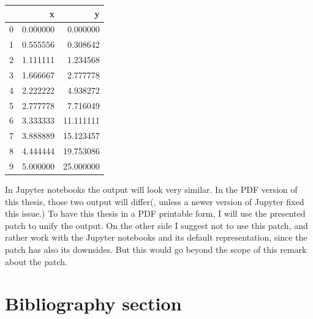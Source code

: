 \documentclass[11pt]{article}
\begin{document}
    
    \begin{center}
    {\begin{tabular}{lrr}
\toprule
{} &         x &          y \\
\midrule
0 &  0.000000 &   0.000000 \\
1 &  0.555556 &   0.308642 \\
2 &  1.111111 &   1.234568 \\
3 &  1.666667 &   2.777778 \\
4 &  2.222222 &   4.938272 \\
5 &  2.777778 &   7.716049 \\
6 &  3.333333 &  11.111111 \\
7 &  3.888889 &  15.123457 \\
8 &  4.444444 &  19.753086 \\
9 &  5.000000 &  25.000000 \\
\bottomrule
\end{tabular}
}
    \end{center}
    

    
    In Jupyter notebooks the output will look very similar. In the PDF
version of this thesis, those two output will differ(, unless a newer
version of Jupyter fixed this issue.) To have this thesis in a PDF
printable form, I will use the presented patch to unify the output. On
the other side I suggest not to use this patch, and rather work with the
Jupyter notebooks and its default representation, since the patch has
also its downsides. But this would go beyond the scope of this remark
about the patch.

    \hypertarget{bibliography-section}{%
\section{Bibliography section}\label{bibliography-section}}

    



    
    
    
\end{document}
